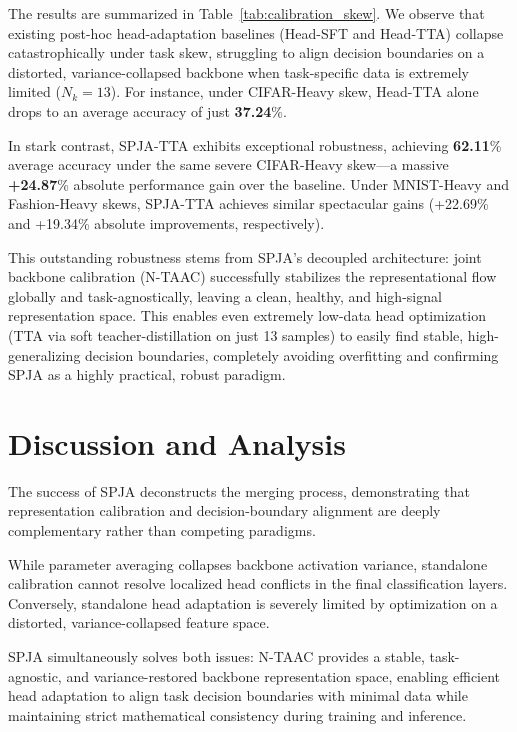 \documentclass{article}
\theoremstyle{plain}
\theoremstyle{definition}
\theoremstyle{remark}
\begin{document}
The results are summarized in Table~\ref{tab:calibration_skew}. We observe that existing post-hoc head-adaptation baselines (Head-SFT and Head-TTA) collapse catastrophically under task skew, struggling to align decision boundaries on a distorted, variance-collapsed backbone when task-specific data is extremely limited ($N_k=13$). For instance, under CIFAR-Heavy skew, Head-TTA alone drops to an average accuracy of just \textbf{37.24}\%.

In stark contrast, SPJA-TTA exhibits exceptional robustness, achieving \textbf{62.11}\% average accuracy under the same severe CIFAR-Heavy skew—a massive \textbf{+24.87}\% absolute performance gain over the baseline. Under MNIST-Heavy and Fashion-Heavy skews, SPJA-TTA achieves similar spectacular gains (+22.69\% and +19.34\% absolute improvements, respectively). 

This outstanding robustness stems from SPJA's decoupled architecture: joint backbone calibration (N-TAAC) successfully stabilizes the representational flow globally and task-agnostically, leaving a clean, healthy, and high-signal representation space. This enables even extremely low-data head optimization (TTA via soft teacher-distillation on just 13 samples) to easily find stable, high-generalizing decision boundaries, completely avoiding overfitting and confirming SPJA as a highly practical, robust paradigm.

\section{Discussion and Analysis}
The success of SPJA deconstructs the merging process, demonstrating that representation calibration and decision-boundary alignment are deeply complementary rather than competing paradigms.

While parameter averaging collapses backbone activation variance, standalone calibration cannot resolve localized head conflicts in the final classification layers. Conversely, standalone head adaptation is severely limited by optimization on a distorted, variance-collapsed feature space.

SPJA simultaneously solves both issues: N-TAAC provides a stable, task-agnostic, and variance-restored backbone representation space, enabling efficient head adaptation to align task decision boundaries with minimal data while maintaining strict mathematical consistency during training and inference.
\end{document}
